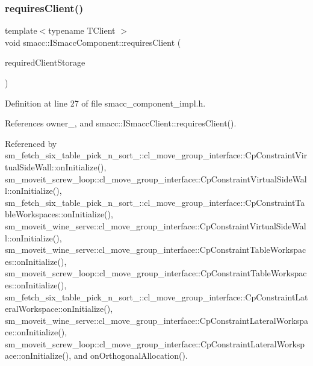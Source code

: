 \subsubsection{\texorpdfstring{requires\+Client()}{requiresClient()}}
{\footnotesize\ttfamily template$<$typename T\+Client $>$ \\
void smacc\+::\+I\+Smacc\+Component\+::requires\+Client (\begin{DoxyParamCaption}\item[{\hyperlink{classTClient}{T\+Client} $\ast$\&}]{required\+Client\+Storage }\end{DoxyParamCaption})\hspace{0.3cm}{\ttfamily [protected]}}



Definition at line 27 of file smacc\+\_\+component\+\_\+impl.\+h.



References owner\+\_\+, and smacc\+::\+I\+Smacc\+Client\+::requires\+Client().



Referenced by sm\+\_\+fetch\+\_\+six\+\_\+table\+\_\+pick\+\_\+n\+\_\+sort\+\_\+::cl\+\_\+move\+\_\+group\+\_\+interface\+::\+Cp\+Constraint\+Virtual\+Side\+Wall\+::on\+Initialize(), sm\+\_\+moveit\+\_\+screw\+\_\+loop\+::cl\+\_\+move\+\_\+group\+\_\+interface\+::\+Cp\+Constraint\+Virtual\+Side\+Wall\+::on\+Initialize(), sm\+\_\+fetch\+\_\+six\+\_\+table\+\_\+pick\+\_\+n\+\_\+sort\+\_\+::cl\+\_\+move\+\_\+group\+\_\+interface\+::\+Cp\+Constraint\+Table\+Workspaces\+::on\+Initialize(), sm\+\_\+moveit\+\_\+wine\+\_\+serve\+::cl\+\_\+move\+\_\+group\+\_\+interface\+::\+Cp\+Constraint\+Virtual\+Side\+Wall\+::on\+Initialize(), sm\+\_\+moveit\+\_\+wine\+\_\+serve\+::cl\+\_\+move\+\_\+group\+\_\+interface\+::\+Cp\+Constraint\+Table\+Workspaces\+::on\+Initialize(), sm\+\_\+moveit\+\_\+screw\+\_\+loop\+::cl\+\_\+move\+\_\+group\+\_\+interface\+::\+Cp\+Constraint\+Table\+Workspaces\+::on\+Initialize(), sm\+\_\+fetch\+\_\+six\+\_\+table\+\_\+pick\+\_\+n\+\_\+sort\+\_\+::cl\+\_\+move\+\_\+group\+\_\+interface\+::\+Cp\+Constraint\+Lateral\+Workspace\+::on\+Initialize(), sm\+\_\+moveit\+\_\+wine\+\_\+serve\+::cl\+\_\+move\+\_\+group\+\_\+interface\+::\+Cp\+Constraint\+Lateral\+Workspace\+::on\+Initialize(), sm\+\_\+moveit\+\_\+screw\+\_\+loop\+::cl\+\_\+move\+\_\+group\+\_\+interface\+::\+Cp\+Constraint\+Lateral\+Workspace\+::on\+Initialize(), and on\+Orthogonal\+Allocation().


